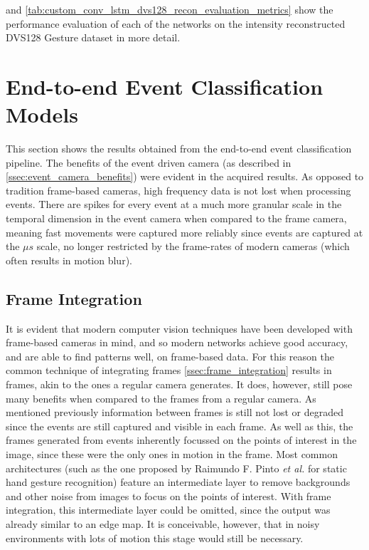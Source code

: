  and \cref{tab:custom_conv_lstm_dvs128_recon_evaluation_metrics} show the performance evaluation of each of the networks on the intensity reconstructed DVS128 Gesture dataset in more detail. 

\section{End-to-end Event Classification Models}

This section shows the results obtained from the end-to-end event classification pipeline. The benefits of the event driven camera (as described in \cref{ssec:event_camera_benefits}) were evident in the acquired results. As opposed to tradition frame-based cameras, high frequency data is not lost when processing events. There are spikes for every event at a much more granular scale in the temporal dimension in the event camera when compared to the frame camera, meaning fast movements were captured more reliably since events are captured at the $\mu s$ scale, no longer restricted by the frame-rates of modern cameras (which often results in motion blur).

\subsection{Frame Integration} \label{ssec:frame_integration_testing}

It is evident that modern computer vision techniques have been developed with frame-based cameras in mind, and so modern networks achieve good accuracy, and are able to find patterns well, on frame-based data. For this reason the common technique of integrating frames \cref{ssec:frame_integration} results in frames, akin to the ones a regular camera generates. It does, however, still pose many benefits when compared to the frames from a regular camera. As mentioned previously information between frames is still not lost or degraded since the events are still captured and visible in each frame. As well as this, the frames generated from events inherently focussed on the points of interest in the image, since these were the only ones in motion in the frame. Most common architectures (such as the one proposed by Raimundo F. Pinto \textit{et al.} for static hand gesture recognition\cite{StaticHandGesture}) feature an intermediate layer to remove backgrounds and other noise from images to focus on the points of interest. With frame integration, this intermediate layer could be omitted, since the output was already similar to an edge map. It is conceivable, however, that in noisy environments with lots of motion this stage would still be necessary.

